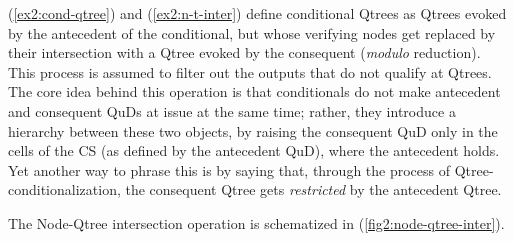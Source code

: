 (\ref{ex2:cond-qtree}) and (\ref{ex2:n-t-inter}) define conditional Qtrees as Qtrees evoked by the antecedent of the conditional, but whose verifying nodes get replaced by their intersection with a Qtree evoked by the consequent (\textit{modulo} reduction). This process is assumed to filter out the outputs that do not qualify at Qtrees. The core idea behind this operation is that conditionals do not make antecedent and consequent QuDs at issue at the same time; rather, they introduce a hierarchy between these two objects, by raising the consequent QuD only in the cells of the CS (as defined by the antecedent QuD), where the antecedent holds. Yet another way to phrase this is by saying that, through the process of Qtree-conditionalization, the consequent Qtree gets \textit{restricted} by the antecedent Qtree.

\begin{exe}
	\label{ex2:cond-qtree}
	\label{ex2:n-t-inter}
\end{exe}


The Node-Qtree intersection operation is schematized in (\ref{fig2:node-qtree-inter}).

